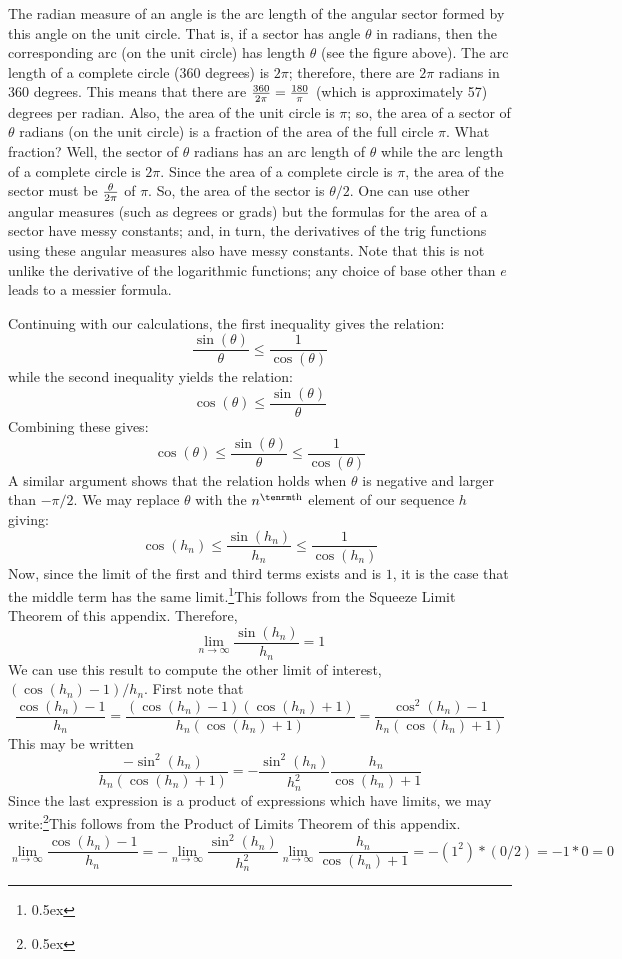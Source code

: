 The radian measure of an angle is the arc 
length of the angular sector 
formed by this angle on the unit circle. That is, if a sector has angle $\theta$ in 
radians, then the corresponding arc (on the unit circle) has length $\theta$ (see 
the figure above).
The arc length of a complete circle 
(360 degrees) is $2\pi$; therefore, there are $2\pi$ radians in 360 degrees. This means
that there are ${360 \over 2 \pi }= {180 \over \pi}$ (which  is approximately 57) degrees per radian. 
Also, the area of the unit circle is $\pi$; so, 
the area of a sector of $\theta$ radians (on the unit circle) is a fraction of the area of the 
full circle $\pi$. What fraction? Well, the sector of $\theta$ radians has an arc length of $\theta$ while
the arc length of a complete circle is $2 \pi$. Since the area of a complete circle is $\pi$, the area
of the sector must be ${\theta \over 2 \pi}$ of $\pi$. So, the area of the sector is $\theta / 2$.
One can use other angular measures (such as degrees or grads) 
but the formulas for the area of a sector have messy constants; and, in turn, 
the derivatives of the trig functions using these angular measures also 
have messy constants. Note that this is not unlike the derivative 
of the logarithmic functions; any choice of base other than $e$ leads to a messier 
formula.

Continuing with our calculations, the first inequality gives 
the relation:
$$
\frac{\sin(\theta)}{\theta} \le \frac{1}{\cos(\theta)}
$$
while the second inequality yields the relation:
$$
\cos(\theta) \le \frac{\sin(\theta)}{\theta}
$$
Combining these gives:
$$
\cos(\theta) \le \frac{\sin(\theta)}{\theta} \le \frac{1}{\cos(\theta)}
$$
A similar argument shows that the relation holds when $\theta$ is negative and larger 
than $-\pi/2$. We may replace $\theta$ with the $n^{\rm th}$ element of our sequence $h$ giving:
$$
\cos(h_n) \le \frac{\sin(h_n)}{h_n} \le \frac{1}{\cos(h_n)}
$$
Now, since the limit of the first and third terms exists and is $1$, it is the case that the middle term has 
the same limit.\footnote{\kern 0.5pt \raise 0.5ex \hbox{\dag}}{This follows from the Squeeze Limit Theorem of this appendix.} Therefore,
$$
\lim_{n\rightarrow \infty} \frac{\sin(h_n)}{h_n} = 1
$$
We can use this result to compute the other limit of interest, 
$(\cos(h_n) - 1)/h_n$. First note that 
$$
\frac{\cos(h_n) - 1}{h_n} = \frac{(\cos(h_n) - 1) (\cos(h_n) + 1)}{h_n (\cos(h_n) + 1)}
= \frac{\cos^2(h_n) - 1}{h_n(\cos(h_n) + 1)}
$$
This may be written 
$$
\frac{-\sin^2(h_n)}{h_n(\cos(h_n) + 1)} = -\frac{\sin^2(h_n)}{h_n^2} \frac{h_n}{\cos(h_n) + 1}
$$
Since the last expression is a product of expressions which have limits, we may 
write:\footnote{\kern 0.5pt \raise 0.5ex \hbox{\ddag}}{This follows from the Product of Limits Theorem of this appendix.}
$$
\lim_{n\rightarrow \infty}\frac{\cos(h_n) - 1}{h_n} = -\lim_{n\rightarrow \infty}
\frac{\sin^2(h_n)}{h_n^2} \lim_{n\rightarrow \infty}\frac{h_n}{\cos(h_n) + 1}
= -(1^2)
 * (0 / 2) = -1 * 0 = 0
$$

